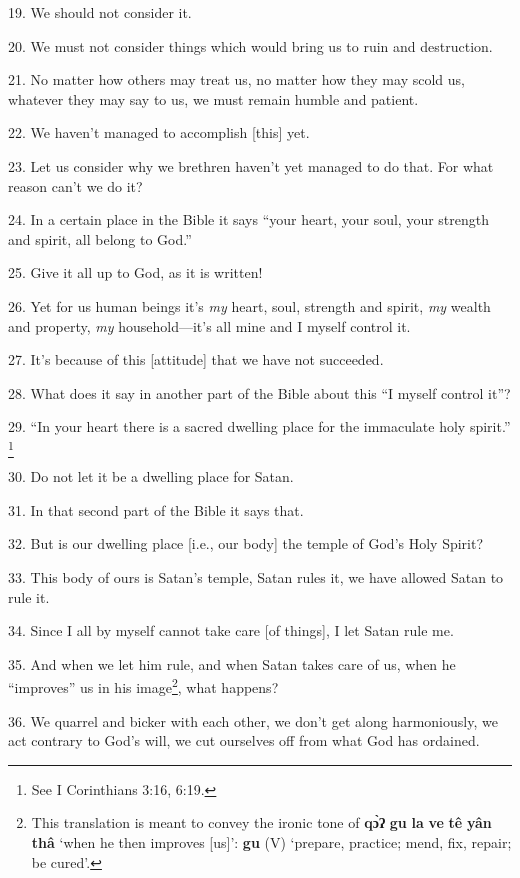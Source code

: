 19. We should not consider it.

20. We must not consider things which would bring us to ruin and destruction.

21. No matter how others may treat us, no matter how they may scold us, whatever
they may say to us, we must remain humble and patient.

22. We haven't managed to accomplish [this] yet.

23. Let us consider why we brethren haven't yet managed to do that. For what reason
can't we do it?

24. In a certain place in the Bible it says ``your heart, your soul, your strength
and spirit, all belong to God.''

25. Give it all up to God, as it is written!

26. Yet for us human beings it's \textit{my} heart, soul, strength and spirit,
\textit{my} wealth and property, \textit{my} household---it's all mine and I myself
control it.

27. It's because of this [attitude] that we have not succeeded.

28. What does it say in another part of the Bible about this ``I myself control
it''?

29. ``In your heart there is a sacred dwelling place for the immaculate holy spirit.''
\footnote{See I Corinthians 3:16, 6:19.}

30. Do not let it be a dwelling place for Satan.

31. In that second part of the Bible it says that.

32. But is our dwelling place [i.e., our body] the temple of God's Holy Spirit?

33. This body of ours is Satan's temple, Satan rules it, we have allowed Satan
to rule it.

34. Since I all by myself cannot take care [of things], I let Satan rule me.

35. And when we let him rule, and when Satan takes care of us, when he ``improves''
us in his image\footnote{This translation is meant to convey the ironic tone of \textbf{qɔ̀ʔ} \textbf{gu} \textbf{la} \textbf{ve} \textbf{tê} \textbf{yân} \textbf{thâ} `when he then improves [us]': \textbf{gu} (V) `prepare, practice; mend, fix, repair; be cured'.}, what happens?

36. We quarrel and bicker with each other, we don't get along harmoniously, we
act contrary to God's will, we cut ourselves off from what God has ordained.

